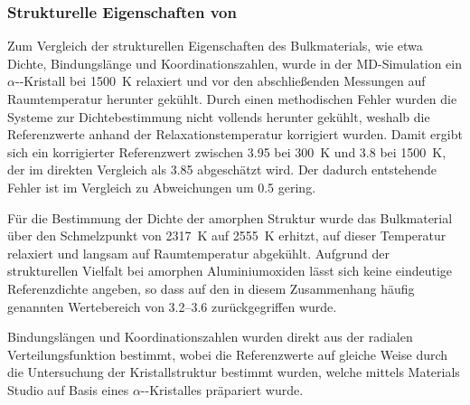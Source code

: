 \subsubsection{Strukturelle Eigenschaften von }

Zum Vergleich der strukturellen Eigenschaften des Bulkmaterials, wie etwa Dichte, Bindungslänge und Koordinationszahlen, wurde in der MD-Simulation ein $\alpha$--Kristall bei \SI{1500}{\kelvin} relaxiert und vor den abschließenden Messungen auf Raumtemperatur herunter gekühlt.
Durch einen methodischen Fehler wurden die Systeme zur Dichtebestimmung nicht vollends herunter gekühlt, weshalb die Referenzwerte anhand der Relaxationstemperatur korrigiert wurden.
Damit ergibt sich ein korrigierter Referenzwert zwischen \SI{3.95}{\gpcc} bei \SI{300}{\kelvin} und \SI{3.8}{\gpcc} bei \SI{1500}{\kelvin}\cite{fiquet_high-temperature_1999}, der im direkten Vergleich als \SI{3.85}{\gpcc} abgeschätzt wird.
Der dadurch entstehende Fehler ist im Vergleich zu Abweichungen um \SI{0.5}{\gpcc} gering.

Für die Bestimmung der Dichte der amorphen Struktur wurde das Bulkmaterial über den Schmelzpunkt von \SI{2317}{\kelvin} auf \SI{2555}{\kelvin} erhitzt, auf dieser Temperatur relaxiert und langsam auf Raumtemperatur abgekühlt.
Aufgrund der strukturellen Vielfalt bei amorphen Aluminiumoxiden lässt sich keine eindeutige Referenzdichte angeben, so dass auf den in diesem Zusammenhang häufig genannten Wertebereich von \SIrange{3.2}{3.6}{\gpcc} zurückgegriffen wurde.

Bindungslängen und Koordinationszahlen wurden direkt aus der radialen Verteilungsfunktion bestimmt, wobei die Referenzwerte auf gleiche Weise durch die Untersuchung der Kristallstruktur bestimmt wurden, welche mittels Materials Studio\cite{biovia_materials_2014} auf Basis eines $\alpha$--Kristalles präpariert wurde.

